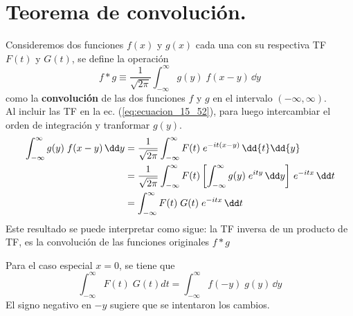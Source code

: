 \section{Teorema de convolución.}
Consideremos dos funciones $f(x)$ y $g(x)$ cada una con su respectiva TF $F(t)$ y $G(t)$, se define la operación
\begin{equation}
f * g \equiv \dfrac{1}{\sqrt{2 \pi}} \int_{-\infty}^{\infty} g(y) \; f(x - y) \, \dd y
\label{eq:ecuacion_15_52}
\end{equation}
como la \textbf{convolución} de las dos funciones $f$ y $g$ en el intervalo $(-\infty, \infty)$. 
\\
Al incluir las TF en la ec. (\ref{eq:ecuacion_15_52}), para luego intercambiar el orden de integración y tranformar $g(y)$. 
\begin{align}
\int_{-\infty}^{\infty} g(y) \; f(x - y) \, \dd y &= \dfrac{1}{\sqrt{2 \pi}} \int_{-\infty}^{\infty} F(t) \; e^{-it(x - y)} \, \dd{t} \dd{y} \saltosin
&= \dfrac{1}{\sqrt{2 \pi}} \int_{-\infty}^{\infty} F(t) \left[ \int_{-\infty}^{\infty} g(y) \; e^{ity} \, \dd y \right] \, e^{-itx} \, \dd t \saltosin
&= \int_{-\infty}^{\infty} F(t) \; G(t) \; e^{-itx} \, \dd t \label{eq:ecuacion_15_53}
\end{align}
Este resultado se puede interpretar como sigue: la TF inversa de un producto de TF, es la convolución de las funciones originales $f * g$
\par
Para el caso especial $x = 0$, se tiene que
\begin{equation}
\int_{-\infty}^{\infty} F(t) \; G(t) dt = \int_{-\infty}^{\infty} f(-y) \; g(y) \, \dd y
\label{eq:ecuacion_15_54}
\end{equation}
El signo negativo en $-y$ sugiere que se intentaron los cambios.


